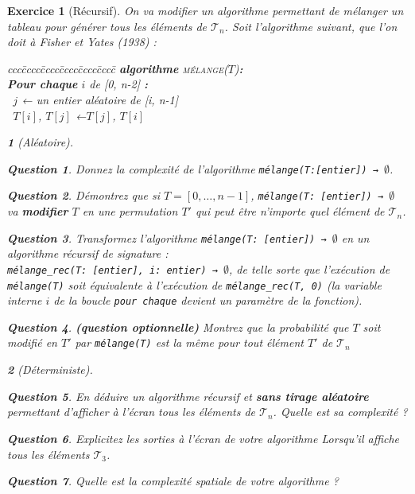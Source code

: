 \documentclass{article}
\theoremstyle{exostyle}
\newtheorem{exo}{Exercice}
\theoremstyle{partiestyle}
\newtheorem{partie}{}[exo]
\theoremstyle{questionstyle}
\newtheorem{questionpartie}{Question}[partie]
\begin{document}
\begin{exo}[Récursif]
    On va modifier un algorithme permettant de mélanger un tableau pour générer tous les éléments de $\mathcal{T}_n$. Soit l'algorithme suivant, que l'on doit à Fisher et Yates (1938) :
        \begin{tabbing}
            ccc\=cccc\=cccc\=cccc\=cccc\=cccc\=\kill
            \textbf{algorithme} \textsc{mélange}($T$){\bf :}\\
            \>\textbf{Pour chaque} $i$ de [0, n-2] {\bf :}\\
            \> \>\vline $\,$ $j$ ← un entier aléatoire de [i, n-1] \\
            \> \>\vline $\,$ $T[i]$, $T[j]$ ←$T[j]$, $T[i]$
        \end{tabbing}

    \begin{partie}[Aléatoire]
        \begin{questionpartie}
            Donnez la complexité de l'algorithme \verb|mélange(T:[entier]) → |$\emptyset$.
        \end{questionpartie}
        \begin{questionpartie}
            Démontrez que si $T=[0, \dots, n-1]$, \verb|mélange(T: [entier]) → |$\emptyset$ va {\bf modifier} $T$ en une permutation $T'$ qui peut être n'importe quel élément de $\mathcal{T}_n$.
        \end{questionpartie}
        \begin{questionpartie}
            Transformez l'algorithme \verb|mélange(T: [entier]) → |$\emptyset$ en un algorithme récursif de signature :\\ \verb|mélange_rec(T: [entier], i: entier) → |$\emptyset$, de telle sorte que l'exécution de \verb|mélange(T)| soit équivalente à l'exécution de \verb|mélange_rec(T, 0)| (la variable interne $i$ de la boucle \verb|pour chaque| devient un paramètre de la fonction). 
        \end{questionpartie}
        \begin{questionpartie}
        {\em\bf (question optionnelle)} Montrez que la probabilité que $T$ soit modifié en $T'$ par \verb|mélange(T)| est la même pour tout élément $T'$ de $\mathcal{T}_n$
        \end{questionpartie}

        \end{partie}
        \begin{partie}[Déterministe]
        \begin{questionpartie}
            En déduire un algorithme récursif et {\bf sans tirage aléatoire} permettant d'afficher à l'écran tous les éléments de $\mathcal{T}_n$. Quelle est sa complexité ?
        \end{questionpartie}
        \begin{questionpartie}
            Explicitez les sorties à l'écran de votre algorithme Lorsqu'il affiche tous les éléments $\mathcal{T}_3$.
        \end{questionpartie}
        \begin{questionpartie}
            Quelle est la complexité spatiale de votre algorithme ?
        \end{questionpartie}


\end{partie}
\end{exo}
\end{document}
